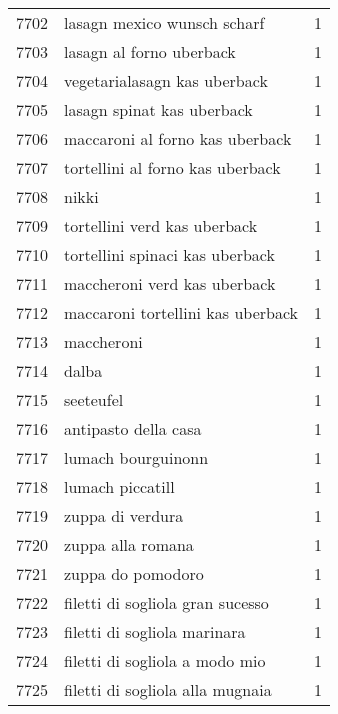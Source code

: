 \begin{tabular}{llr}
7702 &                        lasagn mexico wunsch scharf &      1 \\
7703 &                           lasagn al forno uberback &      1 \\
7704 &                       vegetarialasagn kas uberback &      1 \\
7705 &                         lasagn spinat kas uberback &      1 \\
7706 &                    maccaroni al forno kas uberback &      1 \\
7707 &                   tortellini al forno kas uberback &      1 \\
7708 &                                              nikki &      1 \\
7709 &                       tortellini verd kas uberback &      1 \\
7710 &                    tortellini spinaci kas uberback &      1 \\
7711 &                       maccheroni verd kas uberback &      1 \\
7712 &                  maccaroni tortellini kas uberback &      1 \\
7713 &                                         maccheroni &      1 \\
7714 &                                              dalba &      1 \\
7715 &                                          seeteufel &      1 \\
7716 &                               antipasto della casa &      1 \\
7717 &                                 lumach bourguinonn &      1 \\
7718 &                                   lumach piccatill &      1 \\
7719 &                                   zuppa di verdura &      1 \\
7720 &                                  zuppa alla romana &      1 \\
7721 &                                  zuppa do pomodoro &      1 \\
7722 &                   filetti di sogliola gran sucesso &      1 \\
7723 &                       filetti di sogliola marinara &      1 \\
7724 &                     filetti di sogliola a modo mio &      1 \\
7725 &                   filetti di sogliola alla mugnaia &      1 \\

\end{tabular}
